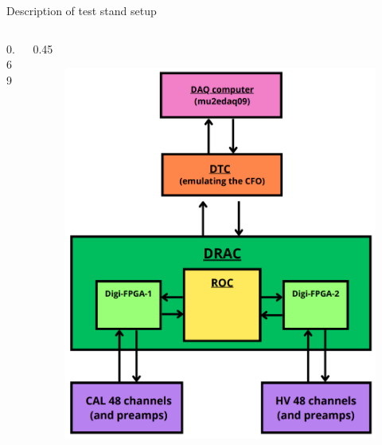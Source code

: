 \documentclass{beamer}
\begin{document}
\begin{frame}{Description of test stand setup}
\begin{columns}
\begin{column}{0.69\framewidth}
\begin{itemize}
      \end{itemize}
          \end{column}
\begin{column}{0.45\framewidth}
        \begin{figure}[h]
          \centering
            \includegraphics[width=0.8\columnwidth]{figures/png/Screenshot_20240712_102528.png}
          \label{fig:enter-label} 
      \end{figure} 
\end{column}
\end{columns}

          \end{frame}
\end{document}
